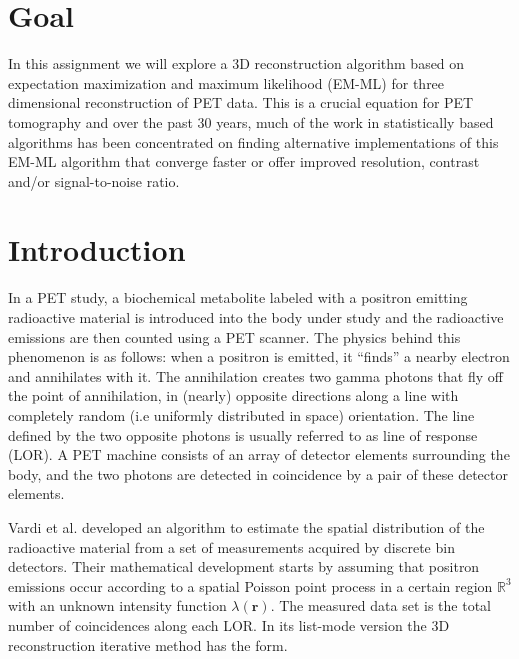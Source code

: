 \documentclass[12pt]{article} %
\begin{document}

\tableofcontents %

\newpage %


\section {Goal}

In this assignment we will explore a 3D reconstruction algorithm based on expectation maximization and maximum likelihood (EM-ML) for three dimensional reconstruction of PET data. This is a crucial equation for PET tomography and over the past 30 years, much of the work in statistically based algorithms has been concentrated on finding alternative implementations of this EM-ML algorithm that converge faster or offer improved resolution, contrast and/or signal-to-noise ratio. 

\section{Introduction} %

In a PET study, a biochemical metabolite labeled with a positron emitting radioactive material is introduced into the body under study and the radioactive emissions are then counted using a PET scanner. The physics behind this phenomenon is as follows: when a positron is emitted, it “finds” a nearby electron and annihilates with it. The annihilation creates two gamma photons that fly off the point of annihilation, in (nearly) opposite directions along a line with completely random (i.e uniformly distributed in space) orientation. The line defined by the two opposite photons is usually referred to as line of response (LOR). A PET machine consists of an array of detector elements surrounding the body, and the two photons are detected in coincidence by a pair of these detector elements.

Vardi et al. \cite{Vardi1985} developed an algorithm to estimate the spatial distribution of the 
radioactive material from a set of measurements acquired by discrete bin detectors. Their mathematical 
development starts by assuming that positron emissions occur according to a spatial Poisson point 
process in a certain region $\mathbb{R}^{3}$ 
with an unknown intensity function  $\lambda(\mathbf{r})$. 
The measured data set is the total number of coincidences along each LOR. In its list-mode version 
\cite{Reader1998} the 3D reconstruction iterative method has the form.
\end{document}
